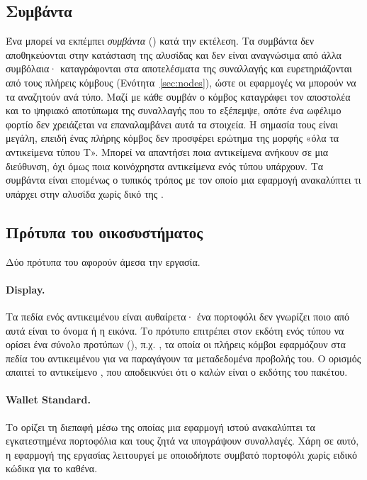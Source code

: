 \subsection{Συμβάντα}
\label{sec:events}

Ένα  μπορεί να εκπέμπει \emph{συμβάντα} () κατά την εκτέλεση. Τα
συμβάντα δεν αποθηκεύονται στην κατάσταση της αλυσίδας και δεν είναι αναγνώσιμα από άλλα
συμβόλαια· καταγράφονται στα αποτελέσματα της συναλλαγής και ευρετηριάζονται από τους
πλήρεις κόμβους (Ενότητα~\ref{sec:nodes}), ώστε οι εφαρμογές να μπορούν να τα αναζητούν ανά τύπο. Μαζί με κάθε
συμβάν ο κόμβος καταγράφει τον αποστολέα και το ψηφιακό αποτύπωμα της συναλλαγής που το
εξέπεμψε, οπότε ένα ωφέλιμο φορτίο δεν χρειάζεται να επαναλαμβάνει αυτά τα στοιχεία. Η σημασία τους
είναι μεγάλη, επειδή ένας πλήρης κόμβος δεν προσφέρει ερώτημα της μορφής «όλα τα
αντικείμενα τύπου Τ». Μπορεί να απαντήσει ποια αντικείμενα ανήκουν σε μια διεύθυνση, όχι
όμως ποια κοινόχρηστα αντικείμενα ενός τύπου υπάρχουν. Τα συμβάντα είναι επομένως ο
τυπικός τρόπος με τον οποίο μια εφαρμογή ανακαλύπτει τι υπάρχει στην αλυσίδα χωρίς δικό
της .

\subsection{Πρότυπα του οικοσυστήματος}
\label{sec:sui-standards}

Δύο πρότυπα του  αφορούν άμεσα την εργασία.

\paragraph{Display.} Τα πεδία ενός αντικειμένου είναι αυθαίρετα· ένα πορτοφόλι δεν
γνωρίζει ποιο από αυτά είναι το όνομα ή η εικόνα. Το πρότυπο 
\cite{sui-display} επιτρέπει στον εκδότη ενός τύπου να ορίσει ένα σύνολο προτύπων
(), π.χ. , τα οποία οι πλήρεις κόμβοι εφαρμόζουν στα
πεδία του αντικειμένου για να παραγάγουν τα μεταδεδομένα προβολής του. Ο ορισμός απαιτεί
το αντικείμενο , που αποδεικνύει ότι ο καλών είναι ο εκδότης του πακέτου.

\paragraph{Wallet Standard.} Το  \cite{wallet-standard} ορίζει τη
διεπαφή μέσω της οποίας μια εφαρμογή ιστού ανακαλύπτει τα εγκατεστημένα πορτοφόλια και
τους ζητά να υπογράψουν συναλλαγές. Χάρη σε αυτό, η εφαρμογή της εργασίας λειτουργεί με
οποιοδήποτε συμβατό πορτοφόλι χωρίς ειδικό κώδικα για το καθένα.

